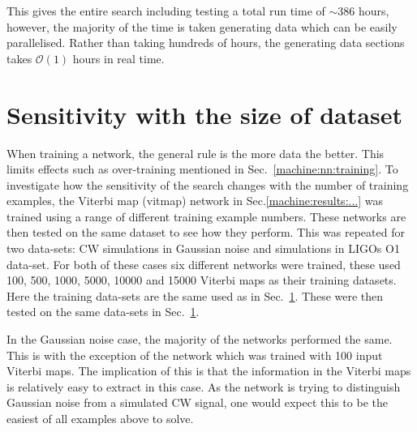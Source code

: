 This gives the entire search including testing a total run time of $ \sim 386$ hours, however, the majority of the time is taken generating data which can be easily parallelised. 
Rather than taking hundreds of hours, the generating data sections takes $\mathcal{O}(1)$ hours in real time.


\section{\label{machine:cnn:sens_size} Sensitivity with the size of dataset}

When training a network, the general rule is the more data the better. 
This limits effects such as over-training mentioned in Sec.~\ref{machine:nn:training}.
To investigate how the sensitivity of the search changes with the number of training examples, the Viterbi map (vitmap) network in Sec.\ref{machine:results:...} was trained using a range of different training example numbers. 
These networks are then tested on the same dataset to see how they perform.
This was repeated for two data-sets: \ac{CW} simulations in Gaussian noise and simulations in \acp{LIGO} O1 data-set. 
For both of these cases six different networks were trained, these used 100, 500, 1000, 5000, 10000 and 15000 Viterbi maps as their training datasets.
Here the training data-sets are the same used as in Sec.~\ref{}.
These were then tested on the same data-sets in Sec.~\ref{}.

In the Gaussian noise case, the majority of the networks performed the same. 
This is with the exception of the network which was trained with 100 input Viterbi maps. 
The implication of this is that the information in the Viterbi maps is relatively easy to extract in this case. 
As the network is trying to distinguish Gaussian noise from a simulated \ac{CW} signal, one would expect this to be the easiest of all examples above to solve. 

